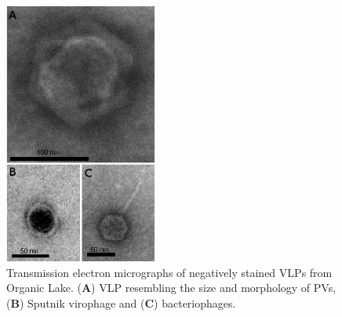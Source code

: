 \begin{figure}
\centering
\includegraphics[width=50mm]{olv_figures/TEM.jpg}
\caption[Transmission electron micrographs of Organic Lake \acs{VLP}s]{Transmission electron micrographs of negatively stained \acs{VLP}s from Organic Lake. 
(\textbf{A}) \acs{VLP} resembling the size and morphology of \acs{PV}s,
(\textbf{B}) Sputnik virophage and (\textbf{C}) bacteriophages.
}
\label{fig:TEM}

\end{figure}

